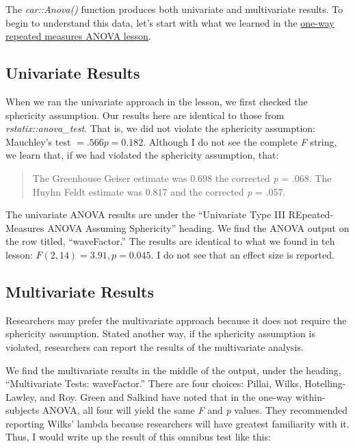 \documentclass[
  11pt,
]{book}
\begin{document}
The \emph{car::Anova()} function produces both univariate and multivariate results. To begin to understand this data, let's start with what we learned in the \protect\hyperlink{Repeated}{one-way repeated measures ANOVA lesson}.

\hypertarget{univariate-results}{%
\subsection*{Univariate Results}\label{univariate-results}}


When we ran the univariate approach in the lesson, we first checked the sphericity assumption. Our results here are identical to those from \emph{rstatix::anova\_test}. That is, we did not violate the sphericity assumption: Mauchley's test \(= .566 p = 0.182\). Although I do not see the complete \emph{F} string, we learn that, if we had violated the sphericity assumption, that:

\begin{quote}
The Greenhouse Geiser estimate was 0.698 the corrected \emph{p} = .068. The Huyhn Feldt estimate was 0.817 and the corrected \emph{p} = .057.
\end{quote}

The univariate ANOVA results are under the ``Univariate Type III REpeated-Measures ANOVA Assuming Sphericity'' heading. We find the ANOVA output on the row titled, ``waveFactor.'' The results are identical to what we found in teh lesson: \(F(2,14) = 3.91, p = 0.045\). I do not see that an effect size is reported.

\hypertarget{multivariate-results}{%
\subsection*{Multivariate Results}\label{multivariate-results}}


Researchers may prefer the multivariate approach because it does not require the sphericity assumption. Stated another way, if the sphericity assumption is violated, researchers can report the results of the multivariate analysis.

We find the multivariate results in the middle of the output, under the heading, ``Multivariate Tests: waveFactor.'' There are four choices: Pillai, Wilks, Hotelling-Lawley, and Roy. Green and Salkind \citeyearpar{green_one-way_2017-1} have noted that in the one-way within-subjects ANOVA, all four will yield the same \emph{F} and \emph{p} values. They recommended reporting Wilks' lambda because researchers will have greatest familiarity with it. Thus, I would write up the result of this omnibus test like this:
\end{document}

